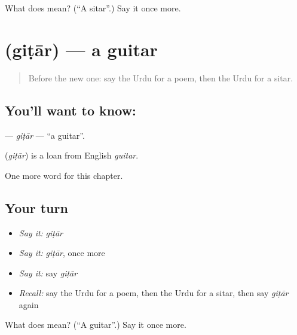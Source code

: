 \begin{tcolorbox}[breakable,colback=teal!4,colframe=teal!35!black,title={Before you move on}]
What does  mean? (\textquotedblleft{}A sitar\textquotedblright{}.) Say it once more.
\end{tcolorbox}
\section[\texorpdfstring{\ur{گٹار} (giṭār)}{گٹار (giṭār)}]{ (giṭār) — a guitar}

\label{lesson:UR-C254-gitar}



\begin{quote}
Before the new one: say the Urdu for a poem, then the Urdu for a sitar.
\end{quote}

\subsection*{You'll want to know: }
\textbf{} — \emph{giṭār} — \textquotedblleft{}a guitar\textquotedblright{}.

\begin{cousinweb}
\textbf{} (\emph{giṭār}) is a loan from English \emph{guitar}.
\end{cousinweb}

\begin{grammarlens}[title={What you've built}]
One more word for this chapter.
\end{grammarlens}

\subsection*{Your turn}
\begin{itemize}
\raggedright
  \item \emph{Say it:} \emph{giṭār}
  \item \emph{Say it:} \emph{giṭār}, once more
  \item \emph{Say it:} say \emph{giṭār}
  \item \emph{Recall:} say the Urdu for a poem, then the Urdu for a sitar, then say \emph{giṭār} again
\end{itemize}

\begin{tcolorbox}[breakable,colback=teal!4,colframe=teal!35!black,title={Before you move on}]
What does  mean? (\textquotedblleft{}A guitar\textquotedblright{}.) Say it once more.
\end{tcolorbox}
